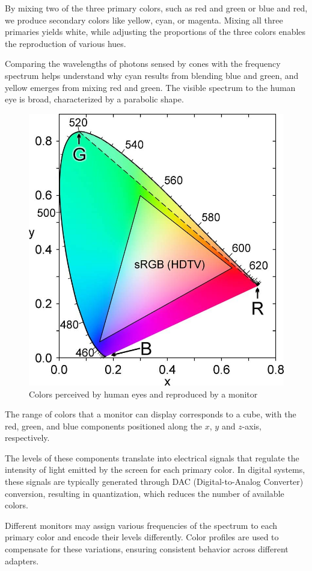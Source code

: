By mixing two of the three primary colors, such as red and green or blue and red, we produce secondary colors like yellow, cyan, or magenta. 
Mixing all three primaries yields white, while adjusting the proportions of the three colors enables the reproduction of various hues.

Comparing the wavelengths of photons sensed by cones with the frequency spectrum helps understand why cyan results from blending blue and green, and yellow emerges from mixing red and green. 
The visible spectrum to the human eye is broad, characterized by a parabolic shape.

\begin{figure}[H]
    \centering
    \includegraphics[width=0.35\linewidth]{images/range.png}
    \caption{Colors perceived by human eyes and reproduced by a monitor}
\end{figure}

The range of colors that a monitor can display corresponds to a cube, with the red, green, and blue components positioned along the $x$, $y$ and $z$-axis, respectively.

The levels of these components translate into electrical signals that regulate the intensity of light emitted by the screen for each primary color. 
In digital systems, these signals are typically generated through DAC (Digital-to-Analog Converter) conversion, resulting in quantization, which reduces the number of available colors.

Different monitors may assign various frequencies of the spectrum to each primary color and encode their levels differently. 
Color profiles are used to compensate for these variations, ensuring consistent behavior across different adapters.